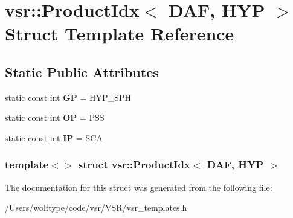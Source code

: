 \hypertarget{structvsr_1_1_product_idx_3_01_d_a_f_00_01_h_y_p_01_4}{\section{vsr\-:\-:Product\-Idx$<$ D\-A\-F, H\-Y\-P $>$ Struct Template Reference}
\label{structvsr_1_1_product_idx_3_01_d_a_f_00_01_h_y_p_01_4}
}
\subsection*{Static Public Attributes}
\begin{DoxyCompactItemize}
\item 
\hypertarget{structvsr_1_1_product_idx_3_01_d_a_f_00_01_h_y_p_01_4_a2e1cf5e274bb7543df06135279fdaae6}{static const int {\bfseries G\-P} = H\-Y\-P\-\_\-\-S\-P\-H}\label{structvsr_1_1_product_idx_3_01_d_a_f_00_01_h_y_p_01_4_a2e1cf5e274bb7543df06135279fdaae6}

\item 
\hypertarget{structvsr_1_1_product_idx_3_01_d_a_f_00_01_h_y_p_01_4_a492d49a12d7ac99743eec766c58bb844}{static const int {\bfseries O\-P} = P\-S\-S}\label{structvsr_1_1_product_idx_3_01_d_a_f_00_01_h_y_p_01_4_a492d49a12d7ac99743eec766c58bb844}

\item 
\hypertarget{structvsr_1_1_product_idx_3_01_d_a_f_00_01_h_y_p_01_4_ac40204aa0411645f5c762dba8ebd831c}{static const int {\bfseries I\-P} = S\-C\-A}\label{structvsr_1_1_product_idx_3_01_d_a_f_00_01_h_y_p_01_4_ac40204aa0411645f5c762dba8ebd831c}

\end{DoxyCompactItemize}
\subsubsection*{template$<$$>$ struct vsr\-::\-Product\-Idx$<$ D\-A\-F, H\-Y\-P $>$}



The documentation for this struct was generated from the following file\-:\begin{DoxyCompactItemize}
\item 
/\-Users/wolftype/code/vsr/\-V\-S\-R/vsr\-\_\-templates.\-h\end{DoxyCompactItemize}

